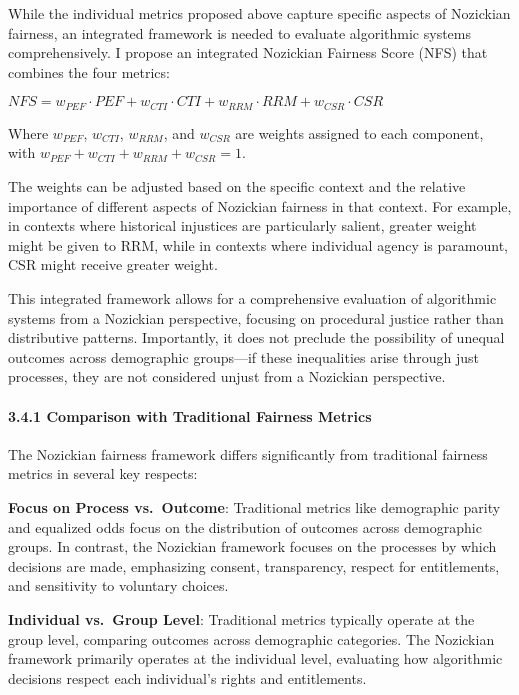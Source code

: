 While the individual metrics proposed above capture specific aspects of
Nozickian fairness, an integrated framework is needed to evaluate
algorithmic systems comprehensively. I propose an integrated Nozickian
Fairness Score (NFS) that combines the four metrics:

\(NFS = w_{PEF} \cdot PEF + w_{CTI} \cdot CTI + w_{RRM} \cdot RRM + w_{CSR} \cdot CSR\)

Where \(w_{PEF}\), \(w_{CTI}\), \(w_{RRM}\), and \(w_{CSR}\) are weights
assigned to each component, with
\(w_{PEF} + w_{CTI} + w_{RRM} + w_{CSR} = 1\).

The weights can be adjusted based on the specific context and the
relative importance of different aspects of Nozickian fairness in that
context. For example, in contexts where historical injustices are
particularly salient, greater weight might be given to RRM, while in
contexts where individual agency is paramount, CSR might receive greater
weight.

This integrated framework allows for a comprehensive evaluation of
algorithmic systems from a Nozickian perspective, focusing on procedural
justice rather than distributive patterns. Importantly, it does not
preclude the possibility of unequal outcomes across demographic
groups---if these inequalities arise through just processes, they are
not considered unjust from a Nozickian perspective.

\paragraph{3.4.1 Comparison with Traditional Fairness
Metrics}\label{comparison-with-traditional-fairness-metrics}

The Nozickian fairness framework differs significantly from traditional
fairness metrics in several key respects:

\textbf{Focus on Process vs.~Outcome}: Traditional metrics like
demographic parity and equalized odds focus on the distribution of
outcomes across demographic groups. In contrast, the Nozickian framework
focuses on the processes by which decisions are made, emphasizing
consent, transparency, respect for entitlements, and sensitivity to
voluntary choices.

\textbf{Individual vs.~Group Level}: Traditional metrics typically
operate at the group level, comparing outcomes across demographic
categories. The Nozickian framework primarily operates at the individual
level, evaluating how algorithmic decisions respect each individual's
rights and entitlements.

